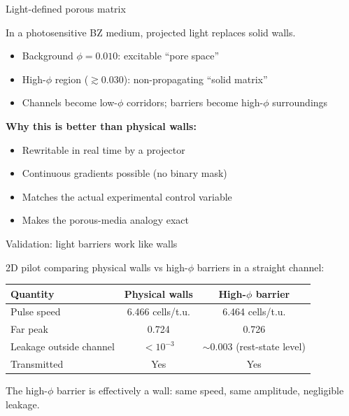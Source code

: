 \documentclass[aspectratio=169,11pt]{beamer}
\begin{document}
\begin{frame}{Light-defined porous matrix}

In a photosensitive BZ medium, projected light replaces solid walls.

\vspace{0.3cm}
\begin{itemize}
    \item Background $\phi = 0.010$: excitable ``pore space''
    \item High-$\phi$ region ($\gtrsim 0.030$): non-propagating ``solid matrix''
    \item Channels become low-$\phi$ corridors; barriers become high-$\phi$ surroundings
\end{itemize}

\vspace{0.3cm}
\textbf{Why this is better than physical walls:}
\begin{itemize}
    \item Rewritable in real time by a projector
    \item Continuous gradients possible (no binary mask)
    \item Matches the actual experimental control variable
    \item Makes the porous-media analogy exact
\end{itemize}

\end{frame}

\begin{frame}{Validation: light barriers work like walls}

2D pilot comparing physical walls vs high-$\phi$ barriers in a straight channel:

\vspace{0.3cm}
\begin{table}
\centering
\footnotesize
\begin{tabular}{lcc}
\toprule
\textbf{Quantity} & \textbf{Physical walls} & \textbf{High-$\phi$ barrier} \\
\midrule
Pulse speed & 6.466 cells/t.u. & 6.464 cells/t.u. \\
Far peak & 0.724 & 0.726 \\
Leakage outside channel & $<10^{-3}$ & $\sim 0.003$ (rest-state level) \\
Transmitted & Yes & Yes \\
\bottomrule
\end{tabular}
\end{table}

\vspace{0.2cm}
The high-$\phi$ barrier is effectively a wall: same speed, same amplitude, negligible leakage.

\end{frame}
\end{document}
